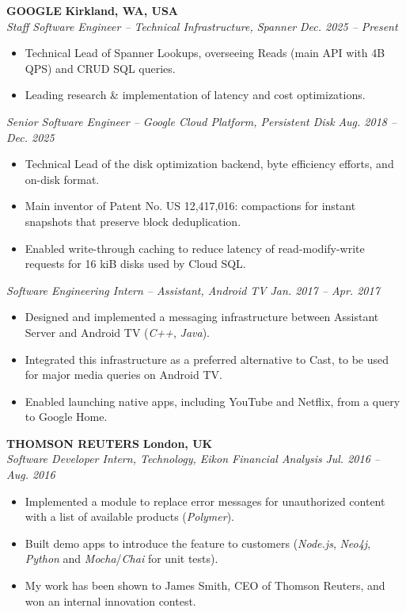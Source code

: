 \documentclass[a4paper, 12pt]{article}
\newcommand{\margincontent}{-0.6cm}
\newcommand{\styletitle}[1]{\textbf{#1}}
\newcommand{\styledesc}[1]{\textit{#1}}
\newcommand{\styleloc}[1]{\textbf{#1}}
\newcommand{\styledates}[1]{\textit{#1}}
\begin{document}
\begin{footnotesize}
\styletitle{GOOGLE} \hfill \styleloc{Kirkland, WA, USA}\\
\styledesc{Staff Software Engineer -- Technical Infrastructure, Spanner} \hfill \styledates{Dec. 2025 -- Present}\\
\vspace{\margincontent}
\begin{itemize}
  \item Technical Lead of Spanner Lookups, overseeing Reads (main API with 4B QPS) and CRUD SQL queries.
  \item Leading research \& implementation of latency and cost optimizations.
\end{itemize}
\styledesc{Senior Software Engineer -- Google Cloud Platform, Persistent Disk} \hfill \styledates{Aug. 2018 -- Dec. 2025}\\
\vspace{\margincontent}
\begin{itemize}
  \item Technical Lead of the disk optimization backend, byte efficiency efforts, and on-disk format.
  \item Main inventor of Patent No. US 12,417,016: compactions for instant snapshots that preserve block deduplication.
  \item Enabled write-through caching to reduce latency of read-modify-write requests for 16 kiB disks used by Cloud SQL.
\end{itemize}
\styledesc{Software Engineering Intern -- Assistant, Android TV} \hfill \styledates{Jan. 2017 -- Apr. 2017}\\
\vspace{\margincontent}
\begin{itemize}
  \item Designed and implemented a messaging infrastructure between Assistant Server and Android TV (\textit{C++}, \textit{Java}).
  \item Integrated this infrastructure as a preferred alternative to Cast, to be used for major media queries on Android TV.
  \item Enabled launching native apps, including YouTube and Netflix, from a query to Google Home.
\end{itemize}

\styletitle{THOMSON REUTERS} \hfill \styleloc{London, UK}\\
\styledesc{Software Developer Intern, Technology, Eikon Financial Analysis} \hfill \styledates{Jul. 2016 -- Aug. 2016}\\
\vspace{\margincontent}
\begin{itemize}
  \item Implemented a module to replace error messages for unauthorized content with a list of available products (\textit{Polymer}).
  \item Built demo apps to introduce the feature to customers (\textit{Node.js}, \textit{Neo4j}, \textit{Python} and \textit{Mocha}/\textit{Chai} for unit tests).
  \item My work has been shown to James Smith, CEO of Thomson Reuters, and won an internal innovation contest.
\end{itemize}


\end{footnotesize}
\end{document}
